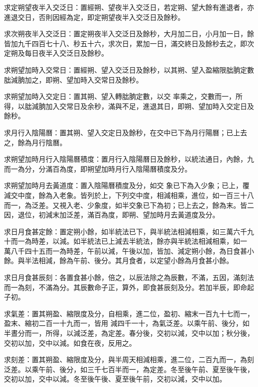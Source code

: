 \begin{pinyinscope}
 求定朔望夜半入交泛日：置經朔、望夜半入交泛日，若定朔、望大餘有進退者，亦進退交日，否則因經為定，即定朔望夜半入交泛日及餘秒。



 求次朔夜半入交泛日：置定朔夜半入交泛日及餘秒，大月加二日，小月加一日，餘皆加九千四百七十八、秒五十六，求次日，累加一日，滿交終日及餘秒去之，即次定朔及每日夜半入交泛日及餘秒。



 求朔望加時入交常日：置經朔、望入交泛日及餘秒，以其朔、望入盈縮限朏朒定數朏減朒加之，即朔、望加時入交常日及餘秒。



 求朔望加時入交定日：置其朔、望入轉朏朒定數，以交
 率乘之，交數而一，所得，以朏減朒加入交常日及余秒，滿與不足，進退其日，即朔、望加時入交定日及餘秒。



 求月行入陰陽曆：置其朔、望入交定日及餘秒，在交中已下為月行陽曆；已上去之，餘為月行陰曆。



 求朔望加時月行入陰陽曆積度：置月行入陰陽曆日及餘秒，以統法通日，內餘，九而一為分，分滿百為度，即朔望加時月行入陰陽曆積度及分。



 求朔望加時月去黃道度：置入陰陽曆積度及分，如交
 象已下為入少象；已上，覆減交中度，餘為入老象。皆列於上，下列交中度，相減相乘，進位，如一百三十八而一，為泛差。又視入老、少象度，如半交象已下為初；已上去之，餘為末。皆二因，退位，初減末加泛差，滿百為度，即朔、望加時月去黃道度及分。



 求日月食甚定餘：置定朔小餘，如半統法已下，與半統法相減相乘，如三萬六千九十而一為時差，以減。如半統法已上減去半統法，餘亦與半統法相減相乘，如一
 萬八千四十五而一為時差，午前以減，午後以加，皆加、減定朔小餘，為日食甚小餘。與半法相減，餘為午前、後分。其月食者，以定望小餘為月食甚小餘。



 求日月食甚辰刻：各置食甚小餘，倍之，以辰法除之為辰數，不滿，五因，滿刻法而一為刻，不滿為分。其辰數命子正，算外，即食甚辰刻及分。若加半辰，即命起子初。



 求氣差：置其朔盈、縮限度及分，自相乘，進二位，盈初、縮末一百九十七而一，盈末、縮初二百一十九而一，皆用
 減四千一十，為氣泛差。以乘午前、後分，如半晝分而一，所得，以減泛差，為定差。春分後，交初以減，交中以加；秋分後，交初以加，交中以減。如食在夜，反用之。



 求刻差：置其朔盈、縮限度及分，與半周天相減相乘，進二位，二百九而一，為刻泛差。以乘午前、後分，如三千七百半而一，為定差。冬至後午前、夏至後午後，交初以加，交中以減。冬至後午後、夏至後午前，交初以減，交中以加。




\end{pinyinscope}
